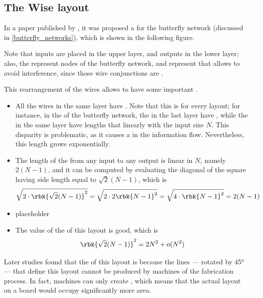 \documentclass[a4paper, 12pt]{report}
\begin{document}
    \subsection{The Wise layout} \label{wise}

    In a paper published by \textcite{butterwise}, it was proposed a  for the butterfly network (discussed in \cref{butterfly_networks}), which is shown in the following figure.


    Note that inputs are placed in the upper layer, and outputs in the lower layer; also, the  represent nodes of the butterfly network, and  represent  that allows to avoid interference, since those wire conjunctions are .


    This rearrangement of the wires allows to have some important .
    
    \begin{itemize}
        \item All the wires in the same layer have . Note that this is  for every layout; for instance, in the  of the butterfly network, the  in the last layer have , while the  in the same layer have lengths that  linearly with the input size $N$. This disparity is problematic, as it causes a  in the information flow. Nevertheless, this length grows exponentially.
        \item The length of the  from any input to any output is linear in $N$, namely $2(N - 1)$, and it can be computed by evaluating the diagonal of the square having side length equal to $\sqrt 2 (N - 1)$, which is $$\sqrt{2 \cdot \rbk{\sqrt{2}(N - 1)}^2} = \sqrt{2 \cdot 2 \rbk{N - 1}^2} = \sqrt{4 \cdot \rbk{N - 1}^2} = 2( N - 1)$$
        \item placeholder 
        \item The value of the  of this layout is good, which is $$\rbk{\sqrt 2(N - 1)}^2 = 2N^2 + o(N^2)$$
    \end{itemize}

    Later studies found that the  of this layout is  because the  lines --- rotated by 45° --- that define this layout cannot be produced by machines of the fabrication process. In fact, machines can only create , which means that the actual layout on a board would occupy significantly more area.
\end{document}
